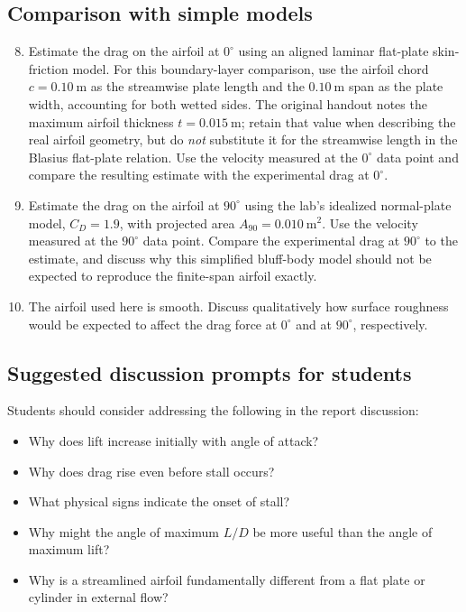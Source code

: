 \documentclass[12pt,letterpaper]{article}
\begin{document}
\subsection*{Comparison with simple models}
\begin{enumerate}[leftmargin=*, label=\arabic*.]
    \setcounter{enumi}{7}
    \item Estimate the drag on the airfoil at \(0^\circ\) using an aligned laminar flat-plate skin-friction model. For this boundary-layer comparison, use the airfoil chord \(c=0.10~\text{m}\) as the streamwise plate length and the \(0.10~\text{m}\) span as the plate width, accounting for both wetted sides. The original handout notes the maximum airfoil thickness \(t=0.015~\text{m}\); retain that value when describing the real airfoil geometry, but do \emph{not} substitute it for the streamwise length in the Blasius flat-plate relation. Use the velocity measured at the \(0^\circ\) data point and compare the resulting estimate with the experimental drag at \(0^\circ\).
    \item Estimate the drag on the airfoil at \(90^\circ\) using the lab's idealized normal-plate model, \(C_D=1.9\), with projected area \(A_{90}=0.010~\mathrm{m^2}\). Use the velocity measured at the \(90^\circ\) data point. Compare the experimental drag at \(90^\circ\) to the estimate, and discuss why this simplified bluff-body model should not be expected to reproduce the finite-span airfoil exactly.
    \item The airfoil used here is smooth. Discuss qualitatively how surface roughness would be expected to affect the drag force at \(0^\circ\) and at \(90^\circ\), respectively.
\end{enumerate}

\subsection*{Suggested discussion prompts for students}
Students should consider addressing the following in the report discussion:
\begin{itemize}[leftmargin=*]
    \item Why does lift increase initially with angle of attack?
    \item Why does drag rise even before stall occurs?
    \item What physical signs indicate the onset of stall?
    \item Why might the angle of maximum \(L/D\) be more useful than the angle of maximum lift?
    \item Why is a streamlined airfoil fundamentally different from a flat plate or cylinder in external flow?
\end{itemize}
\end{document}
